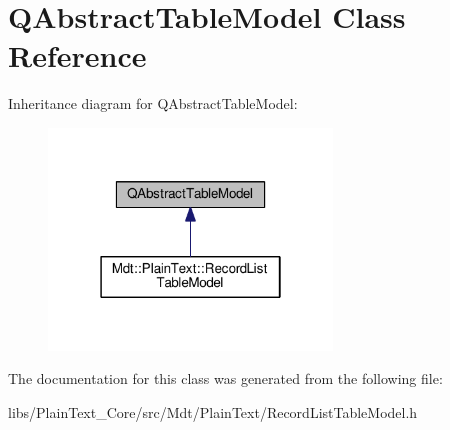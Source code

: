 \hypertarget{class_q_abstract_table_model}{}\section{Q\+Abstract\+Table\+Model Class Reference}
\label{class_q_abstract_table_model}


Inheritance diagram for Q\+Abstract\+Table\+Model\+:
\nopagebreak
\begin{figure}[H]
\begin{center}
\leavevmode
\includegraphics[width=214pt]{class_q_abstract_table_model__inherit__graph}
\end{center}
\end{figure}


The documentation for this class was generated from the following file\+:\begin{DoxyCompactItemize}
\item 
libs/\+Plain\+Text\+\_\+\+Core/src/\+Mdt/\+Plain\+Text/Record\+List\+Table\+Model.\+h\end{DoxyCompactItemize}
